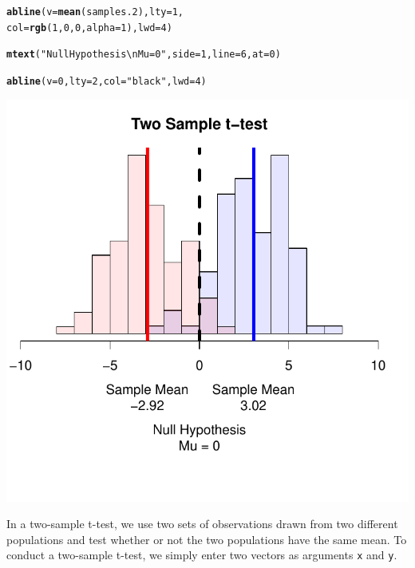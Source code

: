 \documentclass{tufte-book}\usepackage[]{graphicx}\usepackage[]{color}
\makeatletter
\def\maxwidth{ %
  \ifdim\Gin@nat@width>\linewidth
    \linewidth
  \else
    \Gin@nat@width
  \fi
}
\newcommand{\hlnum}[1]{\textcolor[rgb]{0.686,0.059,0.569}{#1}}%
\newcommand{\hlstr}[1]{\textcolor[rgb]{0.192,0.494,0.8}{#1}}%
\newcommand{\hlstd}[1]{\textcolor[rgb]{0.345,0.345,0.345}{#1}}%
\newcommand{\hlkwc}[1]{\textcolor[rgb]{0.333,0.667,0.333}{#1}}%
\newcommand{\hlkwd}[1]{\textcolor[rgb]{0.737,0.353,0.396}{\textbf{#1}}}%
\newenvironment{kframe}{%
 \def\at@end@of@kframe{}%
 \ifinner\ifhmode%
  \def\at@end@of@kframe{\end{minipage}}%
  \begin{minipage}{\columnwidth}%
 \fi\fi%
 \def\FrameCommand##1{\hskip\@totalleftmargin \hskip-\fboxsep
 \colorbox{shadecolor}{##1}\hskip-\fboxsep
     \hskip-\linewidth \hskip-\@totalleftmargin \hskip\columnwidth}%
 \MakeFramed {\advance\hsize-\width
   \@totalleftmargin\z@ \linewidth\hsize
   \@setminipage}}%
 {\par\unskip\endMakeFramed%
 \at@end@of@kframe}
\newenvironment{knitrout}{}{} %
\makeatother
\begin{document}
\begin{footnotesize}
\begin{marginfigure}
\begin{tiny}
\begin{knitrout}
\begin{kframe}
\begin{alltt}
\hlkwd{abline}\hlstd{(}\hlkwc{v} \hlstd{=} \hlkwd{mean}\hlstd{(samples.2),} \hlkwc{lty} \hlstd{=} \hlnum{1}\hlstd{,}
       \hlkwc{col} \hlstd{=} \hlkwd{rgb}\hlstd{(}\hlnum{1}\hlstd{,} \hlnum{0}\hlstd{,} \hlnum{0}\hlstd{,} \hlkwc{alpha} \hlstd{=} \hlnum{1}\hlstd{),} \hlkwc{lwd} \hlstd{=} \hlnum{4}\hlstd{)}

\hlkwd{mtext}\hlstd{(}\hlstr{"Null Hypothesis\textbackslash{}nMu = 0"}\hlstd{,} \hlkwc{side} \hlstd{=} \hlnum{1}\hlstd{,} \hlkwc{line} \hlstd{=} \hlnum{6}\hlstd{,} \hlkwc{at} \hlstd{=}\hlnum{0}\hlstd{)}

\hlkwd{abline}\hlstd{(}\hlkwc{v} \hlstd{=} \hlnum{0}\hlstd{,} \hlkwc{lty} \hlstd{=} \hlnum{2}\hlstd{,} \hlkwc{col} \hlstd{=} \hlstr{"black"}\hlstd{,} \hlkwc{lwd} \hlstd{=} \hlnum{4}\hlstd{)}
\end{alltt}
\end{kframe}
\includegraphics[width=\maxwidth]{figure/unnamed-chunk-230-1} 

\end{knitrout}
\end{tiny}
\end{marginfigure}

In a two-sample t-test, we use two sets of observations drawn from two different populations and test whether or not the two populations have the same mean. To conduct a two-sample t-test, we simply enter two vectors as arguments \texttt{x} and \texttt{y}. 


\end{footnotesize}
\end{document}
